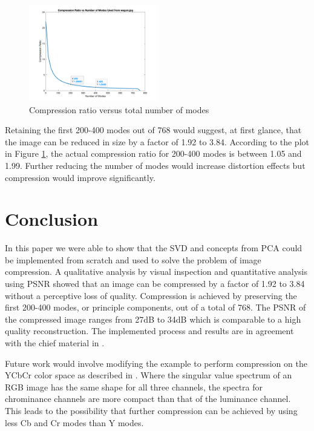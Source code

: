 \documentclass[conference]{IEEEtran}
\begin{document}
    \begin{figure}[t]
    \includegraphics[width=0.5\textwidth]{comprVsModes_rgb}
    \caption{Compression ratio versus total number of modes}
    \label{fig:comprvsr}
    \end{figure}
    
    Retaining the first 200-400 modes out of 768 would suggest, at first glance, that the image can be reduced in size by a factor of 1.92 to 3.84. According to the plot in Figure \ref{fig:comprvsr}, the actual compression ratio for 200-400 modes is between 1.05 and 1.99. Further reducing the number of modes would increase distortion effects but compression would improve significantly.

    \section{Conclusion}

    In this paper we were able to show that the SVD and concepts from PCA could be implemented from scratch and used to solve the problem of image compression. A qualitative analysis by visual inspection and quantitative analysis using PSNR showed that an image can be compressed by a factor of 1.92 to 3.84 without a perceptive loss of quality. Compression is achieved by preserving the first 200-400 modes, or principle components, out of a total of 768. The PSNR of the compressed image ranges from 27dB to 34dB which is comparable to a high quality reconstruction. The implemented process and results are in agreement with the chief material in \cite{jaradet_svd_image_compression}.
    
    Future work would involve modifying the example to perform compression on the YCbCr color space as described in \cite{xu_color_conversion}. Where the singular value spectrum of an RGB image has the same shape for all three channels, the spectra for chrominance channels are more compact than that of the luminance channel. This leads to the possibility that further compression can be achieved by using less Cb and Cr modes than Y modes.
\end{document}
